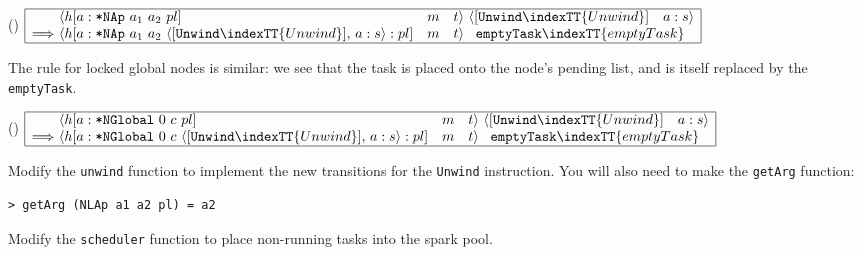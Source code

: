     \begin{flushleft}
        \hspace{1em} (\therulenumber) \hspace{1em}
       $\begin{array}{|l@{~ \langle }lll@{\rangle ~ }rr|}
       \hline
&h[a: \mbox{\tt *NAp}\  a_1\  a_2\ pl]& m& t & \langle [\mbox{\tt Unwind}\indexTT{Unwind}] & a:s\rangle\\
\Longrightarrow &
h[a: \mbox{\tt *NAp}\  a_1\  a_2\ \langle [\mbox{\tt Unwind}\indexTT{Unwind}],\,a:s\rangle:pl] &
  {m} & t & \multicolumn{2}{l|}{\mbox{\tt emptyTask}\indexTT{emptyTask}}\\ \hline
\end{array}$
\end{flushleft}

The rule for locked global nodes is similar: we see that the task is
placed onto the node's pending list, and is itself replaced by the
\mbox{\tt emptyTask}.

    \begin{flushleft}
        \hspace{1em} (\therulenumber) \hspace{1em}
       $\begin{array}{|l@{~ \langle }lll@{\rangle ~ }rr|}
       \hline &
h[a: \mbox{\tt *NGlobal}\ 0\ c\ pl]& m&t &\langle [\mbox{\tt Unwind}\indexTT{Unwind}] & a:s\rangle \\
\Longrightarrow &
h[a: \mbox{\tt *NGlobal}\ 0\ c\ \langle [\mbox{\tt Unwind}\indexTT{Unwind}],\,a:s\rangle:pl] &
  {m} & {t} & \multicolumn{2}{l|}{\mbox{\tt emptyTask}\indexTT{emptyTask}}\\ \hline
\end{array}$
\end{flushleft}

\begin{exercise}\label{pgm:X:4:unwind}
Modify the \mbox{\tt unwind} function to implement the new transitions for the
\mbox{\tt Unwind} instruction. You will also need to make the \mbox{\tt getArg} function:
\begin{verbatim}
> getArg (NLAp a1 a2 pl) = a2
\end{verbatim}
%
\end{exercise}

\begin{exercise}\label{pgm:X:4:scheduler}
Modify the \mbox{\tt scheduler} function to place non-running tasks into the
spark pool.
\end{exercise}

